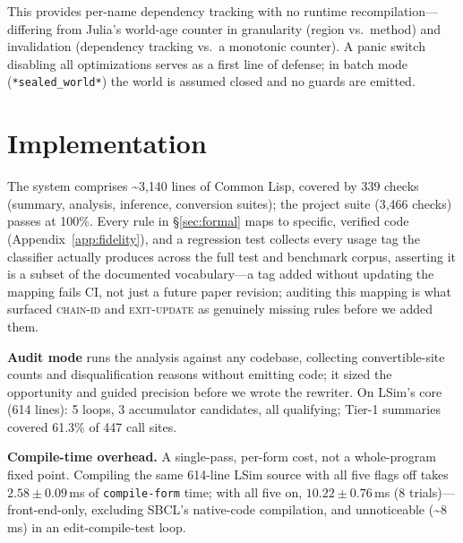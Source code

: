 \documentclass[sigplan,review,anonymous]{acmart}
\begin{document}
This provides per-name dependency tracking with no runtime recompilation---differing from Julia's world-age counter in granularity (region vs.\ method) and invalidation (dependency tracking vs.\ a monotonic counter). A panic switch disabling all optimizations serves as a first line of defense; in batch mode (\texttt{*sealed\_world*}) the world is assumed closed and no guards are emitted.

\section{Implementation}
\label{sec:implementation}
The system comprises \textasciitilde3,140 lines of Common Lisp, covered by 339 checks (summary, analysis, inference, conversion suites); the project suite (3,466 checks) passes at 100\%. Every rule in §\ref{sec:formal} maps to specific, verified code (Appendix~\ref{app:fidelity}), and a regression test collects every usage tag the classifier actually produces across the full test and benchmark corpus, asserting it is a subset of the documented vocabulary---a tag added without updating the mapping fails CI, not just a future paper revision; auditing this mapping is what surfaced \textsc{chain-id} and \textsc{exit-update} as genuinely missing rules before we added them.

\textbf{Audit mode} runs the analysis against any codebase, collecting convertible-site counts and disqualification reasons without emitting code; it sized the opportunity and guided precision before we wrote the rewriter. On LSim's core (614 lines): 5 loops, 3 accumulator candidates, all qualifying; Tier-1 summaries covered 61.3\% of 447 call sites.

\textbf{Compile-time overhead.} A single-pass, per-form cost, not a whole-program fixed point. Compiling the same 614-line LSim source with all five flags off takes $2.58\pm0.09$\,ms of \texttt{compile-form} time; with all five on, $10.22\pm0.76$\,ms (8 trials)---front-end-only, excluding SBCL's native-code compilation, and unnoticeable (\textasciitilde8\,ms) in an edit-compile-test loop.
\end{document}
